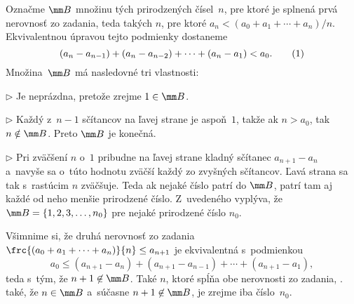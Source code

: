 {%
Označme $\mm B$ množinu tých prirodzených čísel~$n$, pre ktoré je splnená prvá nerovnosť zo zadania, teda takých $n$, pre ktoré $a_n<(a_0+a_1+\cdots+a_n)/n$. Ekvivalentnou úpravou tejto podmienky dostaneme
$$
(a_n - a_{n-1}) + (a_n - a_{n-2}) + \cdots + (a_n - a_1) < a_0.
\tag1
$$
Množina~$\mm B$ má nasledovné tri vlastnosti:
\item{$\triangleright$}
Je neprázdna, pretože zrejme $1\in\mm B$.
\item{$\triangleright$}
Každý z~$n-1$ sčítancov na ľavej strane  je aspoň~$1$, takže ak $n>a_0$, tak $n\notin\mm B$. Preto $\mm B$ je konečná.
\item{$\triangleright$}
Pri zväčšení $n$ o~$1$ pribudne na ľavej strane  kladný sčítanec $a_{n+1}-a_n$ a~navyše sa o~túto hodnotu zväčší každý zo zvyšných sčítancov.
Ľavá strana  sa tak s~rastúcim $n$ zväčšuje. Teda ak nejaké číslo patrí do $\mm B$, patrí tam aj každé od neho menšie prirodzené číslo.
\endgraf\noindent
Z~uvedeného vyplýva, že $\mm B=\{1, 2, 3, \dots, n_0\}$ pre nejaké prirodzené číslo $n_0$.

Všimnime si, že druhá nerovnosť zo zadania $\frc{(a_0+a_1+\cdots+a_n)}{n}  \le a_{n+1}$ je ekvivalentná s~podmienkou
$$
a_0 \le (a_{n + 1} - a_{n}) + (a_{n+1} - a_{n-1}) + \cdots + (a_{n+1} - a_1),
$$
teda s~tým, že $n+1 \not\in\mm B$. Také $n$, ktoré spĺňa obe nerovnosti zo zadania, \tj. také, že $n\in\mm B$ a~súčasne $n+1 \not\in\mm B$, je zrejme iba číslo~$n_0$.
}


